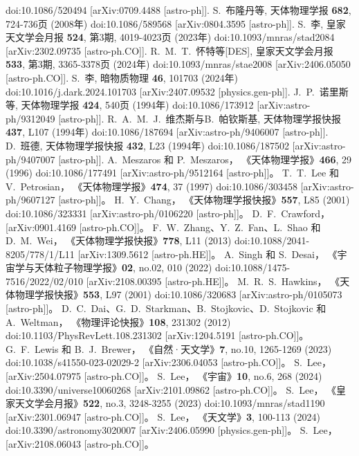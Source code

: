 \documentclass[jkps,preprint,fleqn]{revtex4}
\begin{document}
\begin{thebibliography}{999}
doi:10.1086/520494
[arXiv:0709.4488 [astro-ph]].
S.~布隆丹等,
天体物理学报 \textbf{682}, 724-736页 (2008年)
doi:10.1086/589568
[arXiv:0804.3595 [astro-ph]].
S.~李,
皇家天文学会月报 \textbf{524}, 第3期, 4019-4023页 (2023年)
doi:10.1093/mnras/stad2084
[arXiv:2302.09735 [astro-ph.CO]].
R.~M.~T.~怀特等[DES],
皇家天文学会月报 \textbf{533}, 第3期, 3365-3378页 (2024年)
doi:10.1093/mnras/stae2008
[arXiv:2406.05050 [astro-ph.CO]].
S.~李,
暗物质物理 \textbf{46}, 101703 (2024年)
doi:10.1016/j.dark.2024.101703
[arXiv:2407.09532 [physics.gen-ph]].
J.~P.~诺里斯等,
天体物理学报 \textbf{424}, 540页 (1994年)
doi:10.1086/173912
[arXiv:astro-ph/9312049 [astro-ph]].
R.~A.~M.~J.~维杰斯与B.~帕钦斯基,
天体物理学报快报 \textbf{437}, L107 (1994年)
doi:10.1086/187694
[arXiv:astro-ph/9406007 [astro-ph]].
D.~班德,
天体物理学报快报 \textbf{432}, L23 (1994年)
doi:10.1086/187502
[arXiv:astro-ph/9407007 [astro-ph]].
A.~Meszaros 和 P.~Meszaros，
《天体物理学报》\textbf{466}, 29 (1996)
doi:10.1086/177491
[arXiv:astro-ph/9512164 [astro-ph]]。
T.~T.~Lee 和 V.~Petrosian，
《天体物理学报》\textbf{474}, 37 (1997)
doi:10.1086/303458
[arXiv:astro-ph/9607127 [astro-ph]]。
H.~Y.~Chang，
《天体物理学报快报》\textbf{557}, L85 (2001)
doi:10.1086/323331
[arXiv:astro-ph/0106220 [astro-ph]]。
D.~F.~Crawford，
[arXiv:0901.4169 [astro-ph.CO]]。
F.~W.~Zhang、Y.~Z.~Fan、L.~Shao 和 D.~M.~Wei，
《天体物理学报快报》\textbf{778}, L11 (2013)
doi:10.1088/2041-8205/778/1/L11
[arXiv:1309.5612 [astro-ph.HE]]。
A.~Singh 和 S.~Desai，
《宇宙学与天体粒子物理学报》\textbf{02}, no.02, 010 (2022)
doi:10.1088/1475-7516/2022/02/010
[arXiv:2108.00395 [astro-ph.HE]]。
M.~R.~S.~Hawkins，
《天体物理学报快报》\textbf{553}, L97 (2001)
doi:10.1086/320683
[arXiv:astro-ph/0105073 [astro-ph]]。
D.~C.~Dai、G.~D.~Starkman、B.~Stojkovic、D.~Stojkovic 和 A.~Weltman，
《物理评论快报》\textbf{108}, 231302 (2012)
doi:10.1103/PhysRevLett.108.231302
[arXiv:1204.5191 [astro-ph.CO]]。
G.~F.~Lewis 和 B.~J.~Brewer，
《自然·天文学》\textbf{7}, no.10, 1265-1269 (2023)
doi:10.1038/s41550-023-02029-2
[arXiv:2306.04053 [astro-ph.CO]]。
S.~Lee，
[arXiv:2504.07975 [astro-ph.CO]]。
S.~Lee，
《宇宙》\textbf{10}, no.6, 268 (2024)
doi:10.3390/universe10060268
[arXiv:2101.09862 [astro-ph.CO]]。
S.~Lee，
《皇家天文学会月报》\textbf{522}, no.3, 3248-3255 (2023)
doi:10.1093/mnras/stad1190
[arXiv:2301.06947 [astro-ph.CO]]。
S.~Lee，
《天文学》\textbf{3}, 100-113 (2024)
doi:10.3390/astronomy3020007
[arXiv:2406.05990 [physics.gen-ph]]。
S.~Lee，
[arXiv:2108.06043 [astro-ph.CO]]。
\end{thebibliography}
\end{document}
